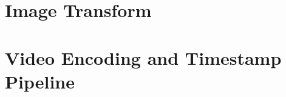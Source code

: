 \documentclass{erauthesis}
\begin{document}


% 

% 

% 




% 


\backmatter


\chapter{Image Transform} \label{img_tform}


\chapter{Video Encoding and Timestamp Pipeline} \label{appendix:video_pipeline}
\end{document}
